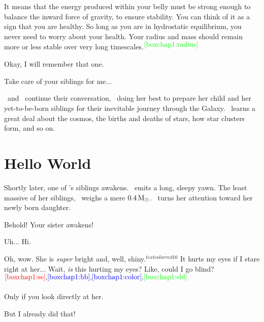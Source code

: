 \documentclass[main.tex]{subfiles}
\begin{document}
\par \Pleione It means that the energy produced within your belly must be strong enough to balance the inward force of gravity, to ensure stability.  You can think of it as a sign that you are healthy.  So long as you are in hydrostatic equilibrium, you never need to worry about your health.  Your radius and mass should remain more or less stable over very long timescales.$^{\textcolor{green}{{\ref{boxchap1:radius}}}}$ 

\par \Maia Okay, I will remember that one.

\par \Pleione Take care of your siblings for me...

\par \nar \rmmaia~and \rmpleione~continue their conversation, \rmpleione~doing her best to prepare her child and her yet-to-be-born siblings for their inevitable journey through the Galaxy.  \rmmaia~learns a great deal about the cosmos, the births and deaths of stars, how star clusters form, and so on.

\section{Hello World} \label{hello}

\par \nar Shortly later, one of \rmmaia's siblings awakens.  \rmelectra~emits a long, sleepy yawn.  The least massive of her siblings, \rmelectra~weighs a mere $0.4\,\mathrm{M}_\odot$.  \rmpleione~turns her attention toward her newly born daughter.

\par \Pleione Behold!  Your sister awakens!

\par \Electra  Uh... Hi.

\par \Maia Oh, wow.  She is \textit{super} bright and, well, shiny.$^{textcolor{red}{10}}$  It hurts my eyes if I stare right at her... Wait, \textit{is} this hurting my eyes?  Like, could I go blind?$^{\textcolor{red}{{\ref{boxchap1:se}}},\textcolor{blue}{\ref{boxchap1:bb}},\textcolor{blue}{\ref{boxchap1:color}},\textcolor{green}{\ref{boxchap1:sbl}}}$

\par \Pleione Only if you look directly at her.

\par \Maia But I already did that!
\end{document}
